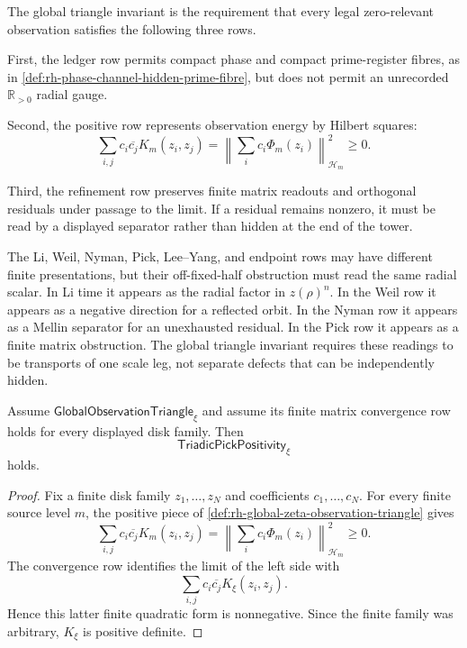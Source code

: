 \begin{definition}
\label{def:rh-global-triangle-invariant}
The global triangle invariant is the requirement that every legal
zero-relevant observation satisfies the following three rows.

First, the ledger row permits compact phase and compact prime-register
fibres, as in \autoref{def:rh-phase-channel-hidden-prime-fibre}, but
does not permit an unrecorded $\mathbb R_{>0}$ radial gauge.

Second, the positive row represents observation energy by Hilbert
squares:
$$
\sum_{i,j}c_i\overline{c_j}K_m(z_i,z_j)
=
\left\|\sum_i c_i\Phi_m(z_i)\right\|_{\mathcal H_m}^2
\ge0.
$$

Third, the refinement row preserves finite matrix readouts and
orthogonal residuals under passage to the limit.  If a residual remains
nonzero, it must be read by a displayed separator rather than hidden at
the end of the tower.
\end{definition}

\begin{principle}
\label{prin:rh-global-common-radial-leg}
The Li, Weil, Nyman, Pick, Lee--Yang, and endpoint rows may have
different finite presentations, but their off-fixed-half obstruction
must read the same radial scalar.  In Li time it appears as the radial
factor in $z(\rho)^n$.  In the Weil row it appears as a negative
direction for a reflected orbit.  In the Nyman row it appears as a
Mellin separator for an unexhausted residual.  In the Pick row it
appears as a finite matrix obstruction.  The global triangle invariant
requires these readings to be transports of one scale leg, not separate
defects that can be independently hidden.
\end{principle}

\begin{theorem}
\label{thm:rh-global-triangle-invariant-gives-pick-positivity}
Assume $\mathsf{GlobalObservationTriangle}_{\xi}$ and assume its finite
matrix convergence row holds for every displayed disk family.  Then
$$
\mathsf{TriadicPickPositivity}_{\xi}
$$
holds.
\end{theorem}

\begin{proof}
Fix a finite disk family $z_1,\ldots,z_N$ and coefficients
$c_1,\ldots,c_N$.  For every finite source level $m$, the positive
piece of \autoref{def:rh-global-zeta-observation-triangle} gives
$$
\sum_{i,j}c_i\overline{c_j}K_m(z_i,z_j)
=
\left\|\sum_i c_i\Phi_m(z_i)\right\|_{\mathcal H_m}^2
\ge0.
$$
The convergence row identifies the limit of the left side with
$$
\sum_{i,j}c_i\overline{c_j}K_{\xi}(z_i,z_j).
$$
Hence this latter finite quadratic form is nonnegative.  Since the
finite family was arbitrary, $K_{\xi}$ is positive definite.
\end{proof}

